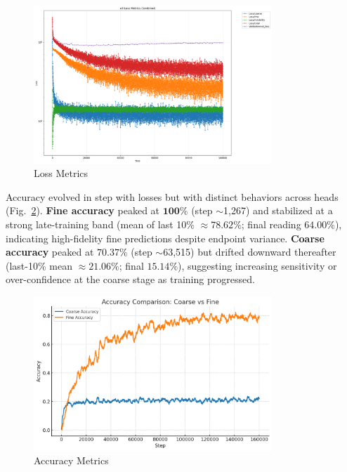 \begin{figure}[H]
    \centering
    \includegraphics[width=0.8\textwidth]{ressources/loss_3.png}
    \caption{Loss Metrics}
    \label{fig:loss_components}
\end{figure}
Accuracy evolved in step with losses but with distinct behaviors across heads (Fig.~\ref{fig:accuracy_metrics3}). \textbf{Fine accuracy} peaked at \(\mathbf{100\%}\) (step \(\sim\)1{,}267) and stabilized at a strong late-training band (mean of last 10\% \(\approx \mathbf{78.62\%}\); final reading \(\mathbf{64.00\%}\)), indicating high-fidelity fine predictions despite endpoint variance. \textbf{Coarse accuracy} peaked at \(\mathbf{70.37\%}\) (step \(\sim\)63{,}515) but drifted downward thereafter (last-10\% mean \(\approx \mathbf{21.06\%}\); final \(\mathbf{15.14\%}\)), suggesting increasing sensitivity or over-confidence at the coarse stage as training progressed.

\begin{figure}[H]
    \centering
    \includegraphics[width=0.8\textwidth]{ressources/accuracy_4.png}
    \caption{Accuracy Metrics}
    \label{fig:accuracy_metrics3}
\end{figure}

